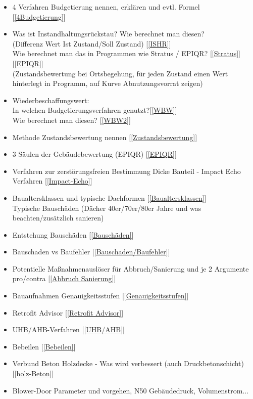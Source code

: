 \documentclass[fleqn,twoside,dvipsnames]{article}
\begin{document}
\begin{itemize}
            \item 4 Verfahren Budgetierung nennen, erklären und evtl. Formel [\ref{4Budgetierung}]
            \item Was ist Instandhaltungsrückstau? Wie berechnet man diesen? \\(Differenz Wert Ist Zustand/Soll Zustand) [\ref{ISHR}]\\
            Wie berechnet man das in Programmen wie Stratus / EPIQR? [\ref{Stratus}] [\ref{EPIQR}] \\ (Zustandsbewertung bei Ortsbegehung, für jeden Zustand einen Wert hinterlegt in Programm, auf Kurve Abnutzungsvorrat zeigen)
            \item Wiederbeschaffungswert:\\
            In welchen Budgetierungsverfahren genutzt?[\ref{WBW}]\\
            Wie berechnet man diesen? [\ref{WBW2}]
            \item Methode Zustandsbewertung nennen [\ref{Zustandsbewertung}]
            \item 3 Säulen der Gebäudebewertung (EPIQR) [\ref{EPIQR}]
            \item Verfahren zur zerstörungsfreien Bestimmung Dicke Bauteil - Impact Echo Verfahren [\ref{Impact-Echo}]
            \item Baualtersklassen und typische Dachformen [\ref{Baualtersklassen}]\\ 
                Typische Bauschäden (Dächer 40er/70er/80er Jahre und was beachten/zusätzlich sanieren)
            \item Entstehung Bauschäden [\ref{Bauschäden}]
            \item Bauschaden vs Baufehler [\ref{Bauschaden/Baufehler}]
            \item Potentielle Maßnahmenauslöser für Abbruch/Sanierung und je 2 Argumente pro/contra [\ref{Abbruch Sanierung}]
            \item Bauaufnahmen Genauigkeitsstufen [\ref{Genauigkeitsstufen}]
            \item Retrofit Advisor [\ref{Retrofit Advisor}]
            \item UHB/AHB-Verfahren [\ref{UHB/AHB}]
            \item Bebeilen [\ref{Bebeilen}]
            \item Verbund Beton Holzdecke - Was wird verbessert (auch Druckbetonschicht) [\ref{holz-Beton}]
            \item Blower-Door Parameter und vorgehen, N50 Gebäudedruck, Volumenstrom...
        \end{itemize}
\end{document}
